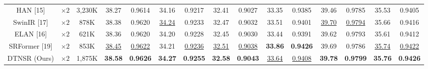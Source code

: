 \documentclass[journal]{IEEEtran}
\begin{document}
\begin{table}
\begin{tabular}{|c|c|c|cc|cc|cc|cc|cc|cc|}
HAN [15] & $\times 2$&3,230K& \multicolumn{1}{c|}{38.27} & 0.9614  & \multicolumn{1}{c|}{34.16} & 0.9217  &\multicolumn{1}{c|}{32.41} & 0.9027 & \multicolumn{1}{c|}{33.35} &0.9385& \multicolumn{1}{c|}{39.46} & 0.9785
&\multicolumn{1}{c|}{35.53} &0.9405\\


SwinIR [17] & $\times 2$ &878K& \multicolumn{1}{c|}{38.38} & {0.9620} & \multicolumn{1}{c|}{\color{blue}\underline{34.24}} &{ 0.9233} & \multicolumn{1}{c|}{32.47} & {0.9032} & \multicolumn{1}{c|}{33.51} & {0.9401} & \multicolumn{1}{c|}{\color{blue}\underline{39.70}} &{\color{blue}\underline{0.9794}} &\multicolumn{1}{c|}{35.66} & { 0.9416}\\

ELAN [16] & $\times 2$ &621K& \multicolumn{1}{c|}{38.36} & 0.9620 & \multicolumn{1}{c|}{34.20} & 0.9228 & \multicolumn{1}{c|}{32.45} & 0.9030 & \multicolumn{1}{c|}{33.44} &0.9391 & \multicolumn{1}{c|}{39.62} & 0.9793
&\multicolumn{1}{c|}{35.61} & 0.9412\\

SRFormer [19] & $\times 2$ &853K& \multicolumn{1}{c|}{\color{blue}\underline{38.45}} & {\color{blue}\underline{0.9622}} & \multicolumn{1}{c|}{34.21} &{\color{blue}\underline{ 0.9236}} & \multicolumn{1}{c|}{\color{blue}\underline{32.51}} & {\color{blue}\underline{0.9038}} & \multicolumn{1}{c|}{\color{red}\textbf{33.86}} & {\color{red}\textbf{0.9426}} & \multicolumn{1}{c|}{39.69} &{0.9786} &\multicolumn{1}{c|}{\color{blue}\underline{35.74}} & {\color{blue}\underline{ 0.9422}}\\

DTNSR (Ours) & $\times 2$ &1,875K& \multicolumn{1}{c|}{\color{red}\textbf{38.58}} &{\color{red}\textbf{0.9626}} & \multicolumn{1}{c|}{\color{red}\textbf{34.27} } &{\color{red}\textbf{ 0.9255}} & \multicolumn{1}{c|}{\color{red}\textbf{32.58}} &{\color{red}\textbf{0.9043}}& \multicolumn{1}{c|}{\color{blue}\underline{33.64}} &{\color{blue}\underline{0.9408}}& \multicolumn{1}{c|}{\color{red}\textbf{39.78}} &{\color{red}\textbf{0.9799}} &\multicolumn{1}{c|}{\color{red}\textbf{35.76}} & {\color{red}\textbf{0.9426}}\\
\hline


\end{tabular}
\end{table}
\end{document}

